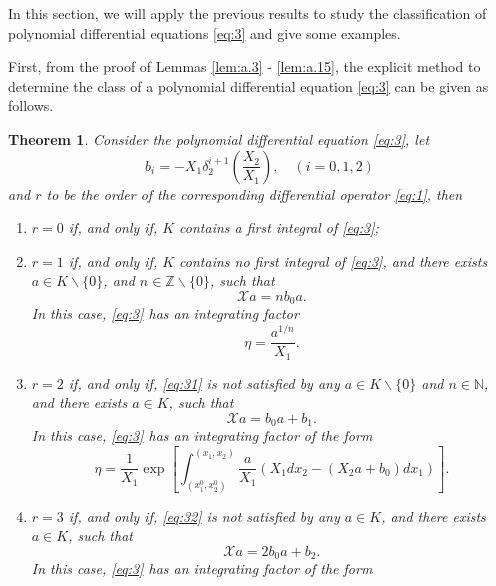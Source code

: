 \documentclass[preprint,12pt]{elsarticle}
\newtheorem{thm}{Theorem}
\begin{document}
In this section,  we will apply the previous results to study the classification of polynomial differential equations \eqref{eq:3} and give some examples.   

First, from the proof of Lemmas \ref{lem:a.3} - \ref{lem:a.15}, the explicit
method to determine the class of a polynomial differential equation  \eqref{eq:3}  can be given as follows.
\begin{thm}
\label{th:2}Consider the polynomial differential equation \eqref{eq:3}, let
\begin{equation}
\label{eq:Bi}
b_i = -X_1\delta_2^{i+1}(\frac{X_2}{X_1}),\quad  (i = 0,1,2)
\end{equation}
and $r$ to be the order of the corresponding differential operator \eqref{eq:1}, then
\begin{enumerate}
\item[(1)] $r=0$ if, and only if, $K$ contains a first integral of \eqref{eq:3}; 
\item[(2)] $r=1$ if, and only if, $K$ contains no first integral of \eqref{eq:3}, and there exists $a\in K\backslash\{0\}$, and $n\in
\mathbb{Z}\backslash\{0\}$, such that
\begin{equation}
\label{eq:31} \mathscr{X} a = n b_0 a.
\end{equation}
In this case, \eqref{eq:3} has an integrating factor 
\begin{equation}
\eta = \dfrac{a^{1/n}}{X_1}.
\end{equation}
 \item[(3)] $r=2$ if, and only if, \eqref{eq:31} is not satisfied by any $a\in K\backslash \{0\}$ and $n\in \mathbb{N}$, and there exists
$a\in K$, such that 
\begin{equation} 
\label{eq:32} 
\mathscr{X} a = b_0 a + b_1.
\end{equation}
In this case, \eqref{eq:3} has an integrating factor of the form
\begin{equation}
\label{eq:3.5}
\eta = \dfrac{1}{X_1}\exp\left[\int_{(x_1^0,x_2^0)}^{(x_1,x_2)} \dfrac{a}{X_1}\left( X_1 d x_2 -(X_2 a + b_0) d x_1 \right)\right].
\end{equation}
 \item[(4)] $r=3$ if, and only if, \eqref{eq:32} is not satisfied by any $a\in K$, and there exists $a\in K$, such that
\begin{equation}
\label{eq:33} \mathscr{X}a = 2 b_0 a +  b_2. 
\end{equation}
In this case, \eqref{eq:3} has an integrating factor of the form
\begin{equation}

\end{equation}
\end{enumerate}
\end{thm}
\end{document}
